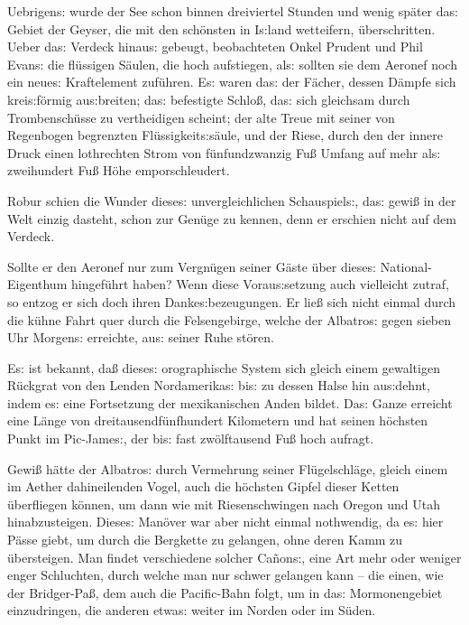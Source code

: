 \documentclass[oneside,12pt]{book}
\newcommand{\s}{s:}
\begin{document}
Uebrigen{\s} wurde der See schon binnen dreiviertel Stunden und wenig
sp\"ater da{\s} Gebiet der Geyser, die mit den sch\"onsten in
I{\s}land wetteifern, \"uberschritten. Ueber da{\s} Verdeck hinau{\s}
gebeugt, beobachteten Onkel Prudent und Phil Evan{\s} die fl\"ussigen
S\"aulen, die hoch aufstiegen, al{\s} sollten sie dem Aeronef noch
ein neue{\s} Kraftelement zuf\"uhren. E{\s} waren da{\s} {\glqq}der
F\"acher{\grqq}, dessen D\"ampfe sich krei{\s}f\"ormig au{\s}breiten;
{\glqq}da{\s} befestigte Schlo{\ss}{\grqq}, da{\s} sich gleichsam
durch Trombensch\"usse zu vertheidigen scheint; {\glqq}der alte
Treue{\grqq} mit seiner von Regenbogen begrenzten
Fl\"ussigkeit{\s}s\"aule, und {\glqq}der Riese{\grqq}, durch den der
innere Druck einen lothrechten Strom von f\"unfundzwanzig Fu{\ss}
Umfang auf mehr al{\s} zweihundert Fu{\ss} H\"ohe emporschleudert.

Robur schien die Wunder diese{\s} unvergleichlichen Schauspiel{\s},
da{\s} gewi{\ss} in der Welt einzig dasteht, schon zur Gen\"uge zu
kennen, denn er erschien nicht auf dem Verdeck.

Sollte er den Aeronef nur zum Vergn\"ugen seiner G\"aste \"uber
diese{\s} National-Eigenthum hingef\"uhrt haben? Wenn diese
Vorau{\s}setzung auch vielleicht zutraf, so ent\/zog er sich doch ihren
Danke{\s}bezeugungen. Er lie{\ss} sich nicht einmal durch die k\"uhne
Fahrt quer durch die Felsengebirge, welche der {\glqq}Albatro{\s}{\grqq}
gegen sieben Uhr Morgen{\s} erreichte, au{\s} seiner Ruhe st\"oren.

E{\s} ist bekannt, da{\ss} diese{\s} orographische System sich gleich
einem gewaltigen R\"uckgrat von den Lenden Nordamerika{\s} bi{\s} zu
dessen Halse hin au{\s}dehnt, indem e{\s} eine Fortsetzung der
mexikanischen Anden bildet. Da{\s} Ganze erreicht eine L\"ange von
dreitausendf\"unfhundert Kilometern und hat seinen h\"ochsten Punkt
im Pic-Jame{\s}, der bi{\s} fast zw\"olftausend Fu{\ss} hoch aufragt.

Gewi{\ss} h\"atte der {\glqq}Albatro{\s}{\grqq} durch Vermehrung
seiner Fl\"ugelschl\"age, gleich einem im Aether dahineilenden Vogel,
auch die h\"ochsten Gipfel dieser Ketten \"uberfliegen k\"onnen, um
dann wie mit Riesenschwingen nach Oregon und Utah hinabzusteigen.
Diese{\s} Man\"over war aber nicht einmal nothwendig, da e{\s} hier
P\"asse giebt, um durch die Bergkette zu gelangen, ohne deren Kamm zu
\"ubersteigen. Man findet verschiedene solcher {\glqq}Ca\~non{\s}{\grqq},
eine Art mehr oder weniger enger Schluchten, durch welche man nur
schwer gelangen kann -- die einen, wie der Bridger-Pa{\ss}, dem auch
die Pacific-Bahn folgt, um in da{\s} Mormonengebiet einzudringen, die
anderen etwa{\s} weiter im Norden oder im S\"uden.
\end{document}
